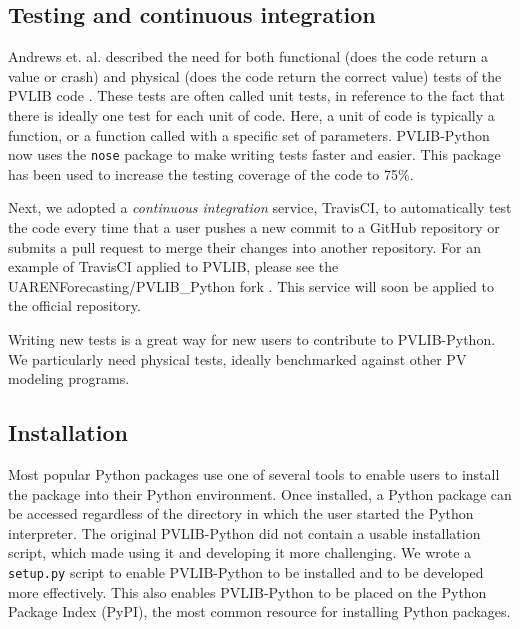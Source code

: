 \documentclass[conference]{IEEEtran}
\begin{document}
\subsection{Testing and continuous integration}

Andrews et. al. described the need for both functional (does the code return a value or crash) and physical (does the code return the correct value) tests of the PVLIB code \cite{andrews}.
These tests are often called unit tests, in reference to the fact that there is ideally one test for each unit of code.
Here, a unit of code is typically a function, or a function called with a specific set of parameters.
PVLIB-Python now uses the \texttt{nose} package \cite{nosetests} to make writing tests faster and easier.
This package has been used to increase the testing coverage of the code to 75\%.

Next, we adopted a \emph{continuous integration} service, TravisCI, to automatically test the code every time that a user pushes a new commit to a GitHub repository or submits a pull request to merge their changes into another repository. 
For an example of TravisCI applied to PVLIB, please see the UARENForecasting/PVLIB{\_}Python fork \cite{uaren-pvlib}.
This service will soon be applied to the official repository.

Writing new tests is a great way for new users to contribute to PVLIB-Python. We particularly need physical tests, ideally benchmarked against other PV modeling programs.


\subsection{Installation}

Most popular Python packages use one of several tools to enable users to install the package into their Python environment.
Once installed, a Python package can be accessed regardless of the directory in which the user started the Python interpreter.
The original PVLIB-Python did not contain a usable installation script, which made using it and developing it more challenging.
We wrote a \texttt{setup.py} script to enable PVLIB-Python to be installed and to be developed more effectively.
This also enables PVLIB-Python to be placed on the Python Package Index (PyPI), the most common resource for installing Python packages.


\end{document}
